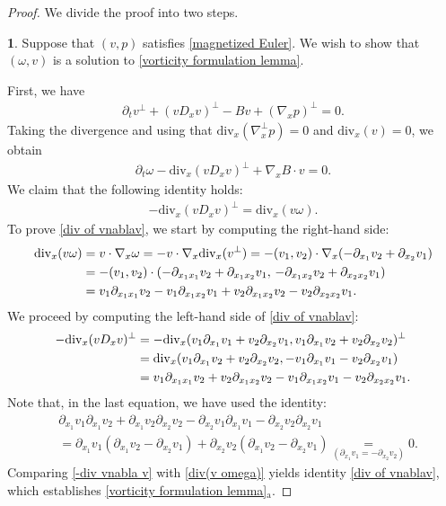 \documentclass[11pt,reqno]{amsart}
\numberwithin{equation}{section}
\begin{document}
\begin{proof} We divide the proof into two steps.

\smallskip
\textbf{1}. 
Suppose that $(v,p)$ satisfies \eqref{magnetized Euler}. 
We wish to show that $(\omega,v)$ is a solution to \eqref{vorticity formulation lemma}. 

First, we have
\begin{align*}
\partial_{t}v^{\perp}+(vD_{x}v)^{\perp}-Bv+(\nabla_{x} p)^{\perp}=0.    
\end{align*}
Taking the divergence and using that $\mathrm{div}_{x}(\nabla^{\perp}_{x} p)=0$ and 
$\mathrm{div}_{x}(v)=0$, we obtain
\begin{align*}
\partial_{t}\omega-\mathrm{div}_{x}(vD_{x} v)^{\perp}+\nabla_{x} B\cdot v=0.  
\end{align*}
We claim that the following identity holds: 
\begin{align}
-\mathrm{div}_{x}(vD_{x} v)^{\perp}=\mathrm{div}_{x}(v\omega). 
\label{div of vnablav}
\end{align} 
To prove \eqref{div of vnablav}, we start by computing the right-hand side: 
\begin{align}
\mathrm{div}_{x}(v\omega)&=v\cdot \nabla_{x} \omega=-v\cdot \nabla_{x} \mathrm{div}_{x}(v^{\perp})=-(v_{1},v_{2})\cdot \nabla_{x} (-\partial_{x_{1}}v_{2}+\partial_{x_{2}}v_{1}) \notag\\
&=-(v_{1},v_{2})\cdot (-\partial_{x_{1}x_{1}}v_{2}+\partial_{x_{1}x_{2}}v_{1},
\,-\partial_{x_{1}x_{2}}v_{2}+\partial_{x_{2}x_{2}}v_{1})\notag\\
&=v_{1}\partial_{x_{1}x_{1}}v_{2}-v_{1}\partial_{x_{1}x_{2}}v_{1}+v_{2}\partial_{x_{1}x_{2}}v_{2}-v_{2}\partial_{x_{2}x_{2}}v_{1}. \label{div(v omega)}
\end{align}
We proceed by computing the left-hand side of \eqref{div of vnablav}: 
\begin{align}
-\mathrm{div}_{x}(vD_{x}v)^{\perp}&=-\mathrm{div}_{x}(v_{1}\partial_{x_{1}}v_{1}+v_{2}\partial_{x_{2}}v_{1},v_{1}\partial_{x_{1}}v_{2}+v_{2}\partial_{x_{2}}v_{2})^{\perp} \notag\\
&=\mathrm{div}_{x}(v_{1}\partial_{x_{1}}v_{2}+v_{2}\partial_{x_{2}}v_{2},-v_{1}\partial_{x_{1}}v_{1}-v_{2}\partial_{x_{2}}v_{1})\notag\\
&=v_{1}\partial_{x_{1}x_{1}}v_{2}+v_{2}\partial_{x_{1}x_{2}}v_{2}-v_{1}\partial_{x_{1}x_{2}}v_{1}-v_{2}\partial_{x_{2}x_{2}}v_{1}. \label{-div vnabla v}
\end{align}
Note that, in the last equation, we have used the identity: 
\begin{align*}
&\partial_{x_{1}}v_{1}\partial_{x_{1}}v_{2}+\partial_{x_{1}}v_{2}\partial_{x_{2}}v_{2}-\partial_{x_{2}}v_{1}\partial_{x_{1}}v_{1}-\partial_{x_{2}}v_{2}\partial_{x_{2}}v_{1}\\
&=\partial_{x_{1}}v_{1}(\partial_{x_{1}}v_{2}-\partial_{x_{2}}v_{1})+\partial_{x_{2}}v_{2}(\partial_{x_{1}}v_{2}-\partial_{x_{2}}v_{1})\underset{(\partial_{x_{1}}v_{1}=-\partial_{x_{2}}v_{2})}{=}0.   
\end{align*}
Comparing \eqref{-div vnabla v} with \eqref{div(v omega)} yields identity \eqref{div of vnablav},
which establishes \eqref{vorticity formulation lemma}$_{\mathrm{a}}$.  


\end{proof}
\end{document}
